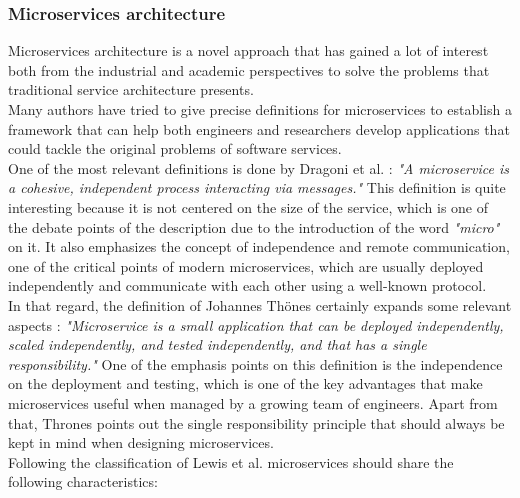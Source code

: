 \documentclass[english, 12pt, a4paper, sci, utf8, a-1b, online]{aaltothesis}
\begin{document}
\subsubsection{Microservices architecture}
\label{sec:microservices-architecture}

Microservices architecture is a novel approach that has gained a lot of interest both from the industrial and academic perspectives to solve the problems that traditional service architecture presents.\\

Many authors have tried to give precise definitions for microservices to establish a framework that can help both engineers and researchers develop applications that could tackle the original problems of software services.\\

One of the most relevant definitions is done by Dragoni et al. \cite{dragoni2017microservices}: \textit{"A microservice is a cohesive, independent process interacting via messages."} This definition is quite interesting because it is not centered on the size of the service, which is one of the debate points of the description due to the introduction of the word \textit{"micro"} on it. It also emphasizes the concept of independence and remote communication, one of the critical points of modern microservices, which are usually deployed independently and communicate with each other using a well-known protocol.\\

In that regard, the definition of Johannes Thönes certainly expands some relevant aspects \cite{thones2015microservices}: \textit{"Microservice is a small application that can be deployed independently, scaled independently, and tested independently, and that has a single responsibility."} One of the emphasis points on this definition is the independence on the deployment and testing, which is one of the key advantages that make microservices useful when managed by a growing team of engineers. Apart from that, Thrones points out the single responsibility principle that should always be kept in mind when designing microservices.\\

Following the classification of Lewis et al. \cite{MicroservicesCharacteristics} microservices should share the following characteristics:
\end{document}
